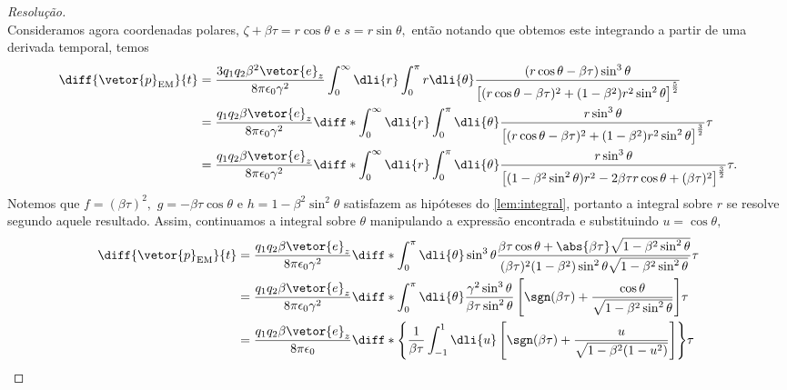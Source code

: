 \begin{proof}[Resolução]
\begin{equation*}
   \end{equation*}
   Consideramos agora coordenadas polares, \(\zeta + \beta \tau = r \cos \theta\) e \(s = r \sin\theta,\) então notando que obtemos este integrando a partir de uma derivada temporal, temos
   \begin{align*}
      \diff{\vetor{p}_\mathrm{EM}}{t} &= \frac{3q_1 q_2 \beta^2\vetor{e}_z}{8\pi \epsilon_0 \gamma^2} \int_0^\infty \dli{r} \int_0^\pi r\dli{\theta} \frac{(r\cos\theta - \beta \tau) \sin^3\theta}{\left[(r\cos\theta - \beta \tau)^2 + (1 - \beta^2) r^2 \sin^2\theta \right]^{\frac52}}\\
                                      &= \frac{q_1 q_2 \beta \vetor{e}_z}{8\pi \epsilon_0 \gamma^2} \diff*{\int_0^\infty \dli{r} \int_0^\pi\dli{\theta} \frac{r \sin^3\theta}{\left[(r \cos\theta - \beta \tau)^2 + (1 - \beta^2) r^2 \sin^2\theta\right]^{\frac32}}}{\tau}\\
                                      &= \frac{q_1 q_2 \beta \vetor{e}_z}{8\pi \epsilon_0 \gamma^2} \diff*{\int_0^\infty \dli{r} \int_0^\pi\dli{\theta} \frac{r \sin^3\theta}{\left[(1 - \beta^2 \sin^2\theta) r^2 - 2 \beta \tau r \cos\theta + (\beta \tau)^2\right]^{\frac32}}}{\tau}.
   \end{align*}
   Notemos que \(f = (\beta \tau)^2,\) \(g = - \beta \tau \cos\theta\) e \(h = 1 - \beta^2 \sin^2\theta\) satisfazem as hipóteses do \cref{lem:integral}, portanto a integral sobre \(r\) se resolve segundo aquele resultado. Assim, continuamos a integral sobre \(\theta\) manipulando a expressão encontrada e substituindo \(u = \cos\theta,\)
   \begin{align*}
      \diff{\vetor{p}_\mathrm{EM}}{t} &= \frac{q_1 q_2 \beta \vetor{e}_z}{8\pi \epsilon_0 \gamma^2} \diff*{\int_0^\pi\dli{\theta} \sin^3\theta \frac{\beta \tau \cos\theta + \abs{ \beta \tau} \sqrt{1 - \beta^2 \sin^2 \theta}}{(\beta \tau)^2 (1 - \beta^2) \sin^2\theta\sqrt{1 - \beta^2 \sin^2 \theta}}}{\tau}\\
                                      &=\frac{q_1 q_2 \beta \vetor{e}_z}{8\pi \epsilon_0 \gamma^2} \diff*{\int_0^\pi\dli{\theta} \frac{\gamma^2\sin^3\theta}{\beta \tau \sin^2\theta}\left[\sgn(\beta \tau) + \frac{\cos\theta}{\sqrt{1 - \beta^2 \sin^2\theta}}\right]}{\tau}\\
                                      &= \frac{q_1 q_2 \beta \vetor{e}_z}{8\pi \epsilon_0} \diff*{\left\{\frac{1}{\beta \tau}\int_{-1}^1 \dli{u} \left[\sgn(\beta \tau)+ \frac{u}{\sqrt{1 - \beta^2 ( 1 - u^2)}}\right]\right\}}{\tau}\\

\end{align*}
\end{proof}
